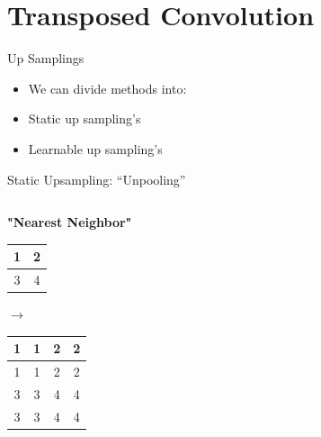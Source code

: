 \documentclass[serif, aspectratio=169]{beamer}
\begin{document}
\section{Transposed Convolution}

\begin{frame}{Up Samplings}
    \begin{itemize}
        \item[] We can divide methods into:
        \vspace{0.3cm}
        \item Static up sampling's
        \item Learnable up sampling's
    \end{itemize}
\end{frame}


\begin{frame}{Static Upsampling: ``Unpooling''}

\begin{columns}[c]
    \begin{column}{0.5\textwidth}
        \centering
        \textbf{"Nearest Neighbor"}\\
        \vspace{0.3cm}
        \begin{tabular}{|c|c|}
            \hline
            1 & 2 \\ \hline
            3 & 4 \\ \hline
        \end{tabular}
        \hspace{0.3cm} $\longrightarrow$ \hspace{0.3cm}
        \begin{tabular}{|c|c|c|c|}
            \hline
            1 & 1 & 2 & 2 \\ \hline
            1 & 1 & 2 & 2 \\ \hline
            3 & 3 & 4 & 4 \\ \hline
            3 & 3 & 4 & 4 \\ \hline
        \end{tabular}
        \vspace{0.3cm}\\
          \begin{flushleft}
        \end{flushleft}
    \end{column}


\end{columns}
\end{frame}
\end{document}
